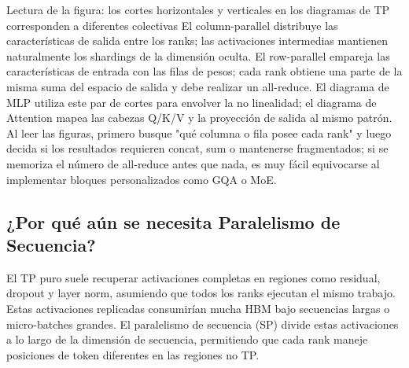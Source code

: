 

\begin{knowledgebox}{Lectura de la figura: los cortes horizontales y verticales en los diagramas de TP corresponden a diferentes colectivas}
El column-parallel distribuye las características de salida entre los ranks; las activaciones intermedias mantienen naturalmente los shardings de la dimensión oculta. El row-parallel empareja las características de entrada con las filas de pesos; cada rank obtiene una parte de la misma suma del espacio de salida y debe realizar un all-reduce. El diagrama de MLP utiliza este par de cortes para envolver la no linealidad; el diagrama de Attention mapea las cabezas Q/K/V y la proyección de salida al mismo patrón. Al leer las figuras, primero busque "qué columna o fila posee cada rank" y luego decida si los resultados requieren concat, sum o mantenerse fragmentados; si se memoriza el número de all-reduce antes que nada, es muy fácil equivocarse al implementar bloques personalizados como GQA o MoE.
\end{knowledgebox}


\subsection{¿Por qué aún se necesita Paralelismo de Secuencia?}

El TP puro suele recuperar activaciones completas en regiones como residual, dropout y layer norm, asumiendo que todos los ranks ejecutan el mismo trabajo. Estas activaciones replicadas consumirían mucha HBM bajo secuencias largas o micro-batches grandes. El paralelismo de secuencia (SP) divide estas activaciones a lo largo de la dimensión de secuencia, permitiendo que cada rank maneje posiciones de token diferentes en las regiones no TP.


